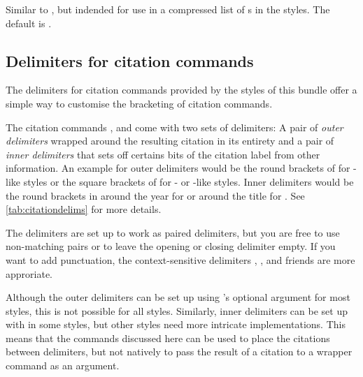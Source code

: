 \documentclass[DIV=9]{scrartcl}
\newcommand*{\highlightbf}[2][1]{\textcolor{highlight#1}{\textbf{#2}}}
\begin{document}
\begin{ltxsyntax}
\CSdelimMark
Similar to , but indended for use in a
compressed list of s in the  styles.
The default is .
\begin{bibexample}
\DeclareDelimFormat{extradateonlycompciterangedelim}{%
  \highlightbf{\bibrangedash}}
\cite{knuth:ct:b,knuth:ct:c,knuth:ct:d}
\end{bibexample}
\end{ltxsyntax}

\subsection{Delimiters for citation commands}\label{sec:opt:citedelims}
The delimiters for citation commands provided by the styles of this bundle
offer a simple way to customise the bracketing of citation commands.

The citation commands ,  and  come with
two sets of delimiters: A pair of \emph{outer delimiters} wrapped around the
resulting citation in its entirety and a pair of \emph{inner delimiters} that
sets off certains bits of the citation label from other information.
An example for outer delimiters would be the round brackets of 
for -like styles or the
square brackets of  for - or
-like styles.
Inner delimiters would be the round brackets in  around
the year for  or around the title for
.
See \cref{tab:citationdelims} for more details.

The delimiters are set up to work as paired delimiters, but you are free to
use non-matching pairs or to leave the opening or closing delimiter empty.
If you want to add punctuation, the context-sensitive delimiters
, ,
 and friends are more approriate.

\begin{remindbox}
Although the outer delimiters can be set up using 's
optional  argument for most styles, this is not possible for all
styles.
Similarly, inner delimiters can be set up with  in some
styles, but other styles need more intricate implementations.
This means that the commands discussed here can be used to place the citations
between delimiters, but not natively to pass the result of a citation to a
wrapper command as an argument.
\end{remindbox}
\end{document}
